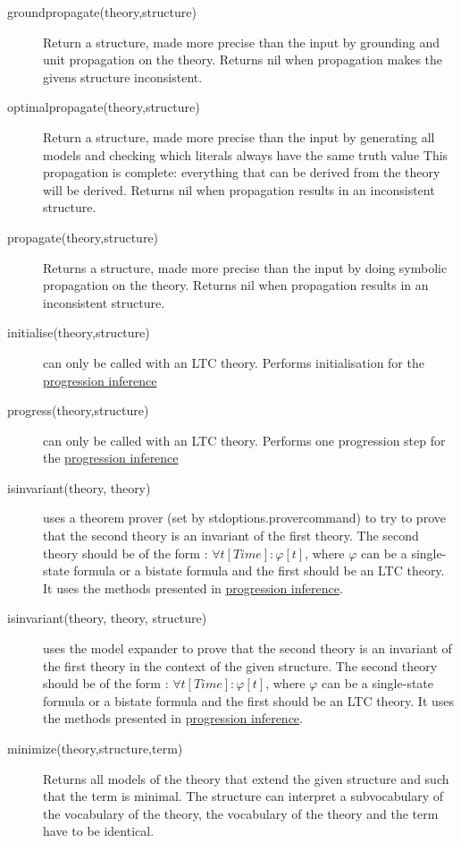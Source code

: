 \begin{description}
 	\item[groundpropagate(theory,structure)]
 		Return a structure, made more precise than the input by grounding and unit propagation on the theory.
		Returns nil when propagation makes the givens structure inconsistent.
	\item[optimalpropagate(theory,structure)]
 		Return a structure, made more precise than the input by generating all models and checking which literals always have the same truth value
 		This propagation is complete: everything that can be derived from the theory will be derived. 
 		Returns nil when propagation results in an inconsistent structure.
	\item[propagate(theory,structure)]
 		Returns a structure, made more precise than the input by doing symbolic propagation on the theory.
 		Returns nil when propagation results in an inconsistent structure.
 	\item[initialise(theory,structure)] can only be called with an LTC theory. Performs initialisation for the \href{https://people.cs.kuleuven.be/~bart.bogaerts/articles/2014/001/Progression.pdf}{progression inference} 
 	\item[progress(theory,structure)] can only be called with an LTC theory. Performs one progression step for the \href{https://people.cs.kuleuven.be/~bart.bogaerts/articles/2014/001/Progression.pdf}{progression inference} 
	\item[isinvariant(theory, theory)] uses a theorem prover (set by stdoptions.provercommand) to try to prove that the second theory is an invariant of the first theory. The second theory should be of the form : $\forall t[Time]:\varphi[t]$, where $\varphi$ can be a single-state formula or a bistate formula and the first should be an LTC theory. It uses the methods presented in \href{https://people.cs.kuleuven.be/~bart.bogaerts/articles/2014/001/Progression.pdf}{progression inference}.
	\item[isinvariant(theory, theory, structure)] uses the model expander to prove that the second theory is an invariant of the first theory in the context of the given structure. The second theory should be of the form : $\forall t[Time]:\varphi[t]$, where $\varphi$ can be a single-state formula or a bistate formula and the first should be an LTC theory. It uses the methods presented in \href{https://people.cs.kuleuven.be/~bart.bogaerts/articles/2014/001/Progression.pdf}{progression inference}.
	\item[minimize(theory,structure,term)] Returns all models of the theory that extend the given structure and such that the term is minimal. The structure can interpret a subvocabulary of the vocabulary of the theory, the vocabulary of the theory and the term have to be identical.

\end{description}
